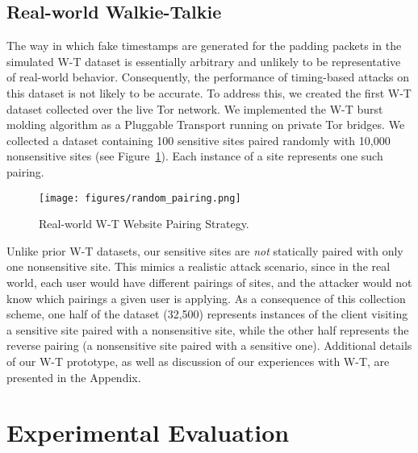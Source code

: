 \documentclass[USenglish,oneside,twocolumn]{article}
\begin{document}
\subsection{Real-world Walkie-Talkie}
\label{sec:real-wt-dataset}

The way in which fake timestamps are generated for the padding packets in the simulated W-T dataset is essentially arbitrary and unlikely to be representative of real-world behavior. Consequently, the performance of timing-based attacks on this dataset is not likely to be accurate. To address this, we created the first W-T dataset collected over the live Tor network. We implemented the W-T burst molding algorithm as a Pluggable Transport running on private Tor bridges. We collected a dataset containing 100 sensitive sites paired randomly with 10,000 nonsensitive sites (see Figure~\ref{pair}). Each instance of a site represents one such pairing. 

\begin{figure}[t]
	\centering
    \texttt{[image: figures/random\_pairing.png]}
    \caption{Real-world W-T Website Pairing Strategy.}
    \label{pair}
    \vskip -0.3cm
\end{figure}

Unlike prior W-T datasets, our sensitive sites are \emph{not} statically paired with only one nonsensitive site. This mimics a realistic attack scenario, since in the real world, each user would have different pairings of sites, and the attacker would not know which pairings a given user is applying. As a consequence of this collection scheme, one half of the dataset (32,500) represents instances of the client visiting a sensitive site paired with a nonsensitive site, while the other half represents the reverse pairing (a nonsensitive site paired with a sensitive one). 
Additional details of our W-T prototype, as well as discussion of our experiences with W-T, are presented in the Appendix. 












 
\section{Experimental Evaluation}
\label{SecExperiments}
\end{document}
